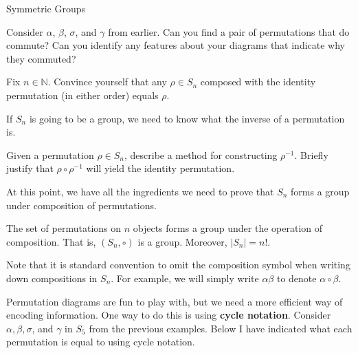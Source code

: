 \begin{section}{Symmetric Groups}
\begin{exercise}
Consider $\alpha$, $\beta$, $\sigma$, and $\gamma$ from earlier.  Can you find a pair of permutations that do commute?  Can you identify any features about your diagrams that indicate why they commuted?
\end{exercise}

\begin{exercise}
Fix $n\in\mathbb{N}$.  Convince yourself that any $\rho\in S_n$ composed with the identity permutation (in either order) equals $\rho$.
\end{exercise}

If $S_n$ is going to be a group, we need to know what the inverse of a permutation is.

\begin{problem}
Given a permutation $\rho\in S_n$, describe a method for constructing $\rho^{-1}$.  Briefly justify that $\rho \circ \rho^{-1}$ will yield the identity permutation.
\end{problem}

At this point, we have all the ingredients we need to prove that $S_n$ forms a group under composition of permutations.

\begin{theorem}
The set of permutations on $n$ objects forms a group under the operation of composition.  That is, $(S_n,\circ)$ is a group.  Moreover, $|S_n|=n!$.
\end{theorem}

Note that it is standard convention to omit the composition symbol when writing down compositions in $S_n$.  For example, we will simply write $\alpha\beta$ to denote $\alpha \circ \beta$.

Permutation diagrams are fun to play with, but we need a more efficient way of encoding information.  One way to do this is using \textbf{cycle notation}.  Consider $\alpha, \beta, \sigma$, and $\gamma$ in $S_{5}$ from the previous examples.  Below I have indicated what each permutation is equal to using cycle notation.


\end{section}
